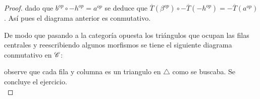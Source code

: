 \documentclass{article}
\begin{document}
\begin{proof}
		dado que $b^{op}\circ -h^{op}=a^{op}$ se deduce que $\overline{T}(\beta^{op})\circ -\overline{T}(-h^{op})=-\overline{T}(a^{op})$. As\'i pues el diagrama anterior es conmutativo.
		
		\bigskip
		
		De modo que pasando a la categoría opuesta los triángulos que ocupan las filas centrales y reescribiendo algunos morfismos se tiene el siguiente diagrama conmutativo en $\mathscr{C}$:
		
		\begin{center}
		\end{center}
		
		observe que cada fila y columna es un triangulo en $\triangle$ como se buscaba. Se concluye el ejercicio.\\
	\end{proof}
\end{document}
